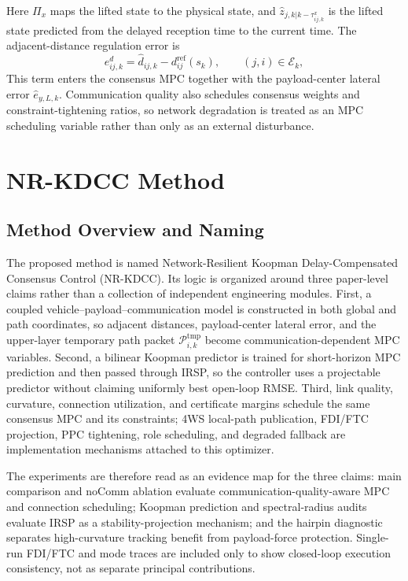 \documentclass[letterpaper,journal]{IEEEtran}
\newcommand{\Method}{NR-KDCC}
\begin{document}
Here $\Pi_x$ maps the lifted state to the physical state, and $\hat z_{j,k|k-\tau^x_{ij,k}}$ is the lifted state predicted from the delayed reception time to the current time. The adjacent-distance regulation error is
\begin{equation}
e^{d}_{ij,k}=\hat d_{ij,k}-d^{\mathrm{ref}}_{ij}(s_k),\qquad (j,i)\in\mathcal E_k ,
\label{eq:adjacent_distance_error}
\end{equation}
This term enters the consensus MPC together with the payload-center lateral error $\hat e_{y,L,k}$. Communication quality also schedules consensus weights and constraint-tightening ratios, so network degradation is treated as an MPC scheduling variable rather than only as an external disturbance.

\section{\Method{} Method}

\subsection{Method Overview and Naming}

The proposed method is named Network-Resilient Koopman Delay-Compensated Consensus Control (\Method{}). Its logic is organized around three paper-level claims rather than a collection of independent engineering modules. First, a coupled vehicle--payload--communication model is constructed in both global and path coordinates, so adjacent distances, payload-center lateral error, and the upper-layer temporary path packet $\mathcal P_{i,k}^{\mathrm{tmp}}$ become communication-dependent MPC variables. Second, a bilinear Koopman predictor is trained for short-horizon MPC prediction and then passed through IRSP, so the controller uses a projectable predictor without claiming uniformly best open-loop RMSE. Third, link quality, curvature, connection utilization, and certificate margins schedule the same consensus MPC and its constraints; 4WS local-path publication, FDI/FTC projection, PPC tightening, role scheduling, and degraded fallback are implementation mechanisms attached to this optimizer.

The experiments are therefore read as an evidence map for the three claims: main comparison and noComm ablation evaluate communication-quality-aware MPC and connection scheduling; Koopman prediction and spectral-radius audits evaluate IRSP as a stability-projection mechanism; and the hairpin diagnostic separates high-curvature tracking benefit from payload-force protection. Single-run FDI/FTC and mode traces are included only to show closed-loop execution consistency, not as separate principal contributions.
\end{document}
